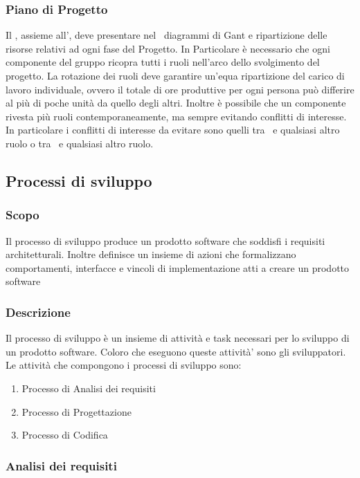 \documentclass[12pt,a4paper]{article}
\begin{document}
\subsubsection{Piano di Progetto} %
Il \PM, assieme all'\AM, deve presentare nel \PdP\ diagrammi di Gant e ripartizione delle risorse relativi ad ogni fase del Progetto. In Particolare è necessario che ogni componente del gruppo ricopra tutti i ruoli nell'arco dello svolgimento del progetto. La rotazione dei ruoli deve garantire un'equa ripartizione del carico di lavoro individuale, ovvero il totale di ore produttive per ogni persona può differire al più di poche unità da quello degli altri. Inoltre è possibile che un componente rivesta più ruoli contemporaneamente, ma sempre evitando conflitti di interesse. In particolare i conflitti di interesse da evitare sono quelli tra \PM\ e qualsiasi altro ruolo o tra \VR\ e qualsiasi altro ruolo.

\subsection{Processi di sviluppo}

\subsubsection{Scopo}
Il processo di sviluppo produce un prodotto software che soddisfi i requisiti architetturali. Inoltre definisce un insieme di azioni che formalizzano comportamenti, interfacce e vincoli di implementazione atti a creare un prodotto software

\subsubsection{Descrizione}
Il processo di sviluppo è un insieme di attività e task necessari per lo sviluppo di un prodotto software. Coloro che eseguono queste attività' sono gli sviluppatori. Le attività che compongono i processi di sviluppo sono:
\begin{enumerate}
\item Processo di Analisi dei requisiti
\item Processo di Progettazione
\item Processo di Codifica
\end{enumerate}

\subsubsection{Analisi dei requisiti} %
\end{document}

